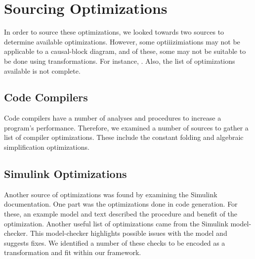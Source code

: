 \section{Sourcing Optimizations}
In order to source these optimizations, we looked towards two sources to determine available optimizations.
However, some optiiizimiations may not be applicable to a causal-block diagram, and of these, some may not be suitable to be done using transformations. For instance, . Also, the list of optimizations available is not complete.

\subsection{Code Compilers}
Code compilers have a number of analyses and procedures to increase a program's performance. Therefore, we examined a number of sources to gather a list of compiler optimizations. These include the constant folding and algebraic simplification optimizations.


\subsection{Simulink Optimizations}
Another source of optimizations was found by examining the Simulink documentation. One part was the optimizations done in code generation. For these, an example model and text described the procedure and benefit of the optimization. Another useful list of optimizations came from the Simulink model-checker. This model-checker highlights possible issues with the model and suggests fixes. We identified a number of these checks to be encoded as a transformation and fit within our framework.